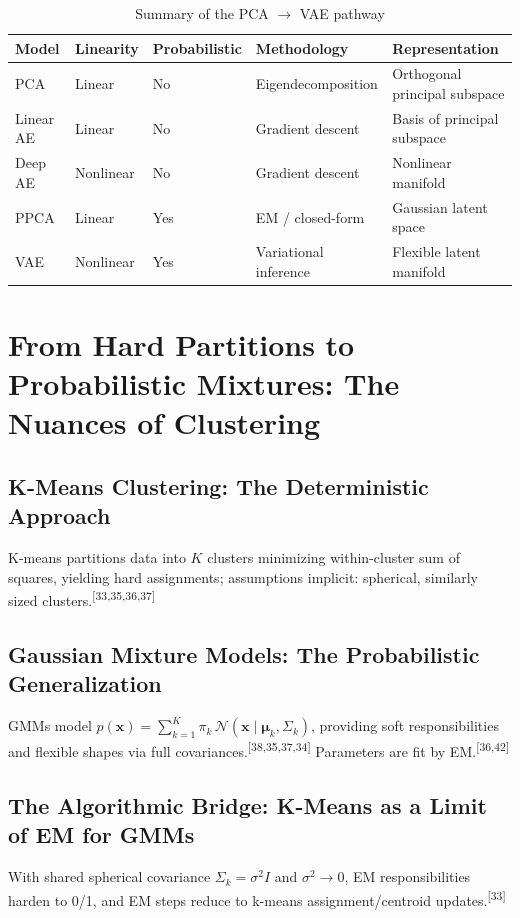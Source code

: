 \documentclass[11pt]{article}
\newcommand{\refnum}[1]{\textsuperscript{[#1]}}
\begin{document}
\begin{table}[h!]
\centering
\caption{Summary of the PCA $\to$ VAE pathway}
\begin{tabular}{@{}lllll@{}}
\toprule
\textbf{Model} & \textbf{Linearity} & \textbf{Probabilistic} & \textbf{Methodology} & \textbf{Representation} \\
\midrule
PCA & Linear & No  & Eigendecomposition & Orthogonal principal subspace \\
Linear AE & Linear & No & Gradient descent & Basis of principal subspace \\
Deep AE & Nonlinear & No & Gradient descent & Nonlinear manifold \\
PPCA & Linear & Yes & EM / closed-form & Gaussian latent space \\
VAE & Nonlinear & Yes & Variational inference & Flexible latent manifold \\
\bottomrule
\end{tabular}
\end{table}

\section{From Hard Partitions to Probabilistic Mixtures: The Nuances of Clustering}

\subsection{K-Means Clustering: The Deterministic Approach}
K-means partitions data into $K$ clusters minimizing within-cluster sum of squares, yielding hard assignments; assumptions implicit: spherical, similarly sized clusters.\refnum{33,35,36,37}

\subsection{Gaussian Mixture Models: The Probabilistic Generalization}
GMMs model $p(\mathbf{x})=\sum_{k=1}^K \pi_k \,\mathcal{N}(\mathbf{x}\mid\boldsymbol{\mu}_k,\Sigma_k)$, providing soft responsibilities and flexible shapes via full covariances.\refnum{38,35,37,34} Parameters are fit by EM.\refnum{36,42}

\subsection{The Algorithmic Bridge: K-Means as a Limit of EM for GMMs}
With shared spherical covariance $\Sigma_k=\sigma^2 I$ and $\sigma^2\!\to\!0$, EM responsibilities harden to 0/1, and EM steps reduce to k-means assignment/centroid updates.\refnum{33}
\end{document}
